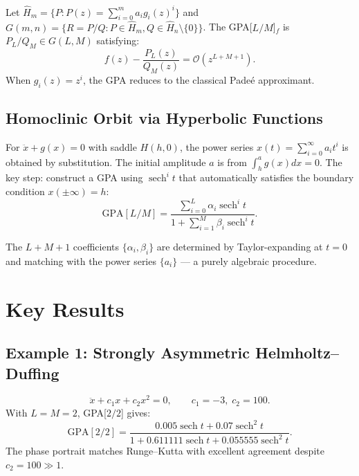 \documentclass[11pt,a4paper]{article}
\begin{document}
Let $\widehat{H}_m = \{P: P(z)=\sum_{i=0}^m a_i g_i(z)^i\}$ and $G(m,n) = \{R=P/Q: P\in\widehat{H}_m, Q\in\widehat{H}_n\setminus\{0\}\}$. The GPA[$L/M$]$_f$ is $P_L/Q_M\in G(L,M)$ satisfying:
\begin{equation}
f(z) - \frac{P_L(z)}{Q_M(z)} = \mathcal{O}(z^{L+M+1}).
\end{equation}
When $g_i(z)=z^i$, the GPA reduces to the classical Pade\'{e} approximant.

\subsection{Homoclinic Orbit via Hyperbolic Functions}

For $\ddot{x} + g(x) = 0$ with saddle $H(h,0)$, the power series $x(t)=\sum_{i=0}^{\infty} a_i t^i$ is obtained by substitution. The initial amplitude $a$ is from $\int_h^a g(x)dx=0$. The key step: construct a GPA using $\operatorname{sech}^i t$ that automatically satisfies the boundary condition $x(\pm\infty)=h$:
\begin{equation}
\boxed{\text{GPA}[L/M] = \frac{\displaystyle\sum_{i=0}^{L} \alpha_i \operatorname{sech}^i t}{\displaystyle 1 + \sum_{i=1}^{M} \beta_i \operatorname{sech}^i t}}.
\end{equation}

The $L+M+1$ coefficients $\{\alpha_i,\beta_i\}$ are determined by Taylor-expanding at $t=0$ and matching with the power series $\{a_i\}$ — a purely algebraic procedure.

\section{Key Results}

\subsection{Example 1: Strongly Asymmetric Helmholtz--Duffing}
\begin{equation}
\ddot{x} + c_1 x + c_2 x^2 = 0,\qquad c_1=-3,\; c_2=100.
\end{equation}
With $L=M=2$, GPA[$2/2$] gives:
\begin{equation}
\text{GPA}[2/2] = \frac{0.005\operatorname{sech} t + 0.07\operatorname{sech}^2 t}{1 + 0.611111\operatorname{sech} t + 0.055555\operatorname{sech}^2 t}.
\end{equation}
The phase portrait matches Runge--Kutta with excellent agreement despite $c_2 = 100 \gg 1$.
\end{document}
